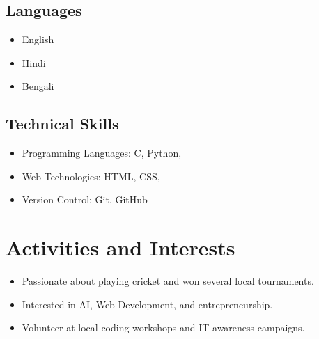 \documentclass[a4paper,12pt]{article}
\begin{document}
\subsection*{Languages}
\begin{itemize}
    \item English 
    \item Hindi 
    \item Bengali 
\end{itemize}

\subsection*{Technical Skills}
\begin{itemize}
    \item Programming Languages: C, Python, 
    \item Web Technologies: HTML, CSS,
    \item Version Control: Git, GitHub
\end{itemize}

\vspace{0.5cm}

\section*{Activities and Interests}
\begin{itemize}
    \item Passionate about playing cricket and won several local tournaments.
    \item Interested in AI, Web Development, and entrepreneurship.
    \item Volunteer at local coding workshops and IT awareness campaigns.
\end{itemize}
\end{document}
